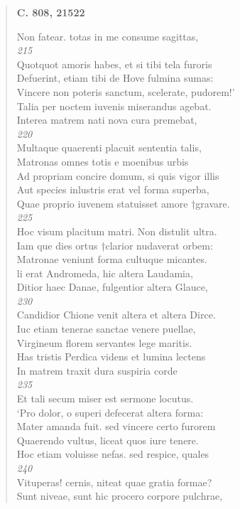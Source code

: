 \documentclass[11pt, a4paper]{report}
\begin{document}
\begin{verse}
    \begin{center} \textbf{C. 808, 21522} \end{center} \marginpar{[294]} Non fatear. totas in me consume sagittas, \\ \textit{215} \\ Quotquot amoris habes, et si tibi tela furoris \\ Defuerint, etiam tibi de Hove fulmina sumas: \\ Vincere non poteris sanctum, scelerate, pudorem!’ \\ Talia per noctem iuvenis miserandus agebat. \\ Interea matrem nati nova cura premebat, \\ \textit{220} \\ Multaque quaerenti placuit sententia talis, \\ Matronas omnes totis e moenibus urbis \\ Ad propriam concire domum, si quis vigor illis \\ Aut species inlustris erat vel forma superba, \\ Quae proprio iuvenem statuisset amore †gravare. \\ \textit{225} \\ Hoc visum placitum matri. Non distulit ultra. \\ Iam \lbrack que \rbrack  dies ortus †clarior nudaverat orbem: \\ Matronae veniunt forma cultuque micantes. \\ li erat Andromeda, hic altera Laudamia, \\ Ditior haec Danae, fulgentior altera Glauce, \\ \textit{230} \\ Candidior Chione venit  \lbrack altera et altera Dirce. \\ Iuc etiam tenerae sanctae venere puellae, \\ Virgineum florem servantes lege maritis. \\ Has tristis Perdica videns et lumina lectens \\ In matrem traxit dura suspiria corde \\ \textit{235} \\ Et tali secum miser est sermone locutus. \\ ‘Pro dolor, o superi defecerat altera forma: \\ Mater amanda fuit. sed vincere certo furorem \\ Quaerendo vultus, liceat quos iure tenere. \\ Hoc etiam voluisse nefas. sed respice, quales \\ \textit{240} \\ Vituperas! cernis, niteat quae gratia formae? \\ Sunt niveae, sunt hic procero corpore pulchrae, \\ 

\end{verse}
\end{document}
